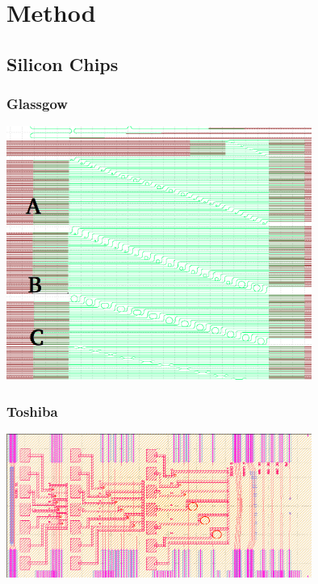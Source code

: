 \section{Method}
\subsection{Silicon Chips}
\subsubsection{Glassgow}
\begingroup
    \centering  
    \includegraphics[width=10cm]{img/results/glassgowChipNumbering.png}
     \vspace{3pt} \label{crossCompare}
\endgroup
\subsubsection{Toshiba}
\begingroup
    \centering  
    \includegraphics[width=10cm]{img/results/toshiba.png}
     \vspace{3pt} \label{crossCompare}
\endgroup
